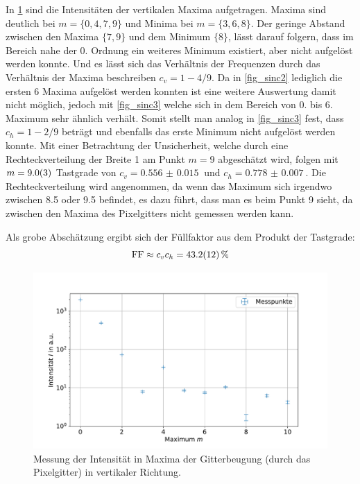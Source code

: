 \documentclass[
	a4paper,
	12pt,
	pagesize,
	ngerman
]{scrartcl}
\begin{document}
		In \cref{fig_sinc1} sind die Intensitäten der vertikalen Maxima aufgetragen.
		Maxima sind deutlich bei $m=\{0,4,7,9\}$ und Minima bei $m=\{3,6,8\}$.
		Der geringe Abstand zwischen den Maxima $\{7,9\}$ und dem Minimum $\{8\}$, lässt darauf folgern, dass im Bereich nahe der 0. Ordnung ein weiteres Minimum existiert, aber nicht aufgelöst werden konnte.
		Und es lässt sich das Verhältnis der Frequenzen durch das Verhältnis der Maxima beschreiben $c_v=1-4/9$.
		Da in \cref{fig_sinc2} lediglich die ersten 6 Maxima aufgelöst werden konnten ist eine weitere Auswertung damit nicht möglich, jedoch mit \cref{fig_sinc3} welche sich in dem Bereich von 0. bis 6. Maximum sehr ähnlich verhält.
		Somit stellt man analog in \cref{fig_sinc3} fest, dass $c_h=1-2/9$ beträgt und ebenfalls das erste Minimum nicht aufgelöst werden konnte.
		Mit einer Betrachtung der Unsicherheit, welche durch eine Rechteckverteilung der Breite 1 am Punkt $m=9$ abgeschätzt wird, folgen mit $m=\SI{9+-0.3}{}$ Tastgrade von $c_v=\SI{0.556(15)}{}$ und $c_h=\SI{0.778(7)}{}$.
		Die Rechteckverteilung wird angenommen, da wenn das Maximum sich irgendwo zwischen \num{8,5} oder \num{9,5} befindet, es dazu führt, dass man es beim Punkt \num{9} sieht, da zwischen den Maxima des Pixelgitters nicht gemessen werden kann.

		Als grobe Abschätzung ergibt sich der Füllfaktor aus dem Produkt der Tastgrade:
		\begin{equation}
			\text{FF} \approx c_v c_h =\SI{43.2+-1.2}{\percent}
		\end{equation}


\begin{figure}[H]
			\includegraphics[width=0.8\linewidth]{img/sinc1}
			\caption{
			Messung der Intensität in Maxima der Gitterbeugung (durch das Pixelgitter) in vertikaler Richtung.
			}
			\label{fig_sinc1}
	\end{figure}
\end{document}
